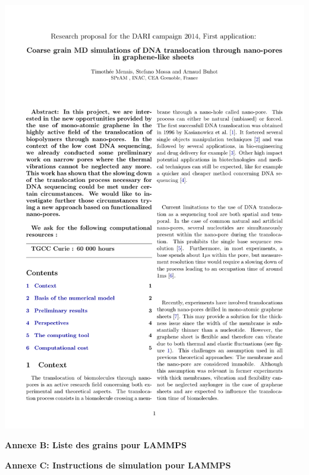 \begin{center}
\includegraphics[width=1\textwidth , page= 6]{dari_menais_mossa_buhot.pdf}



\end{center}
\newpage



\newpage

{\Large\textbf{{Annexe B: Liste des grains pour LAMMPS}}}\\

{}

\begin{figure}
\label{annexeb}
\end{figure}

\newpage

{\Large\textbf{{Annexe C: Instructions de simulation pour LAMMPS}}}\\

